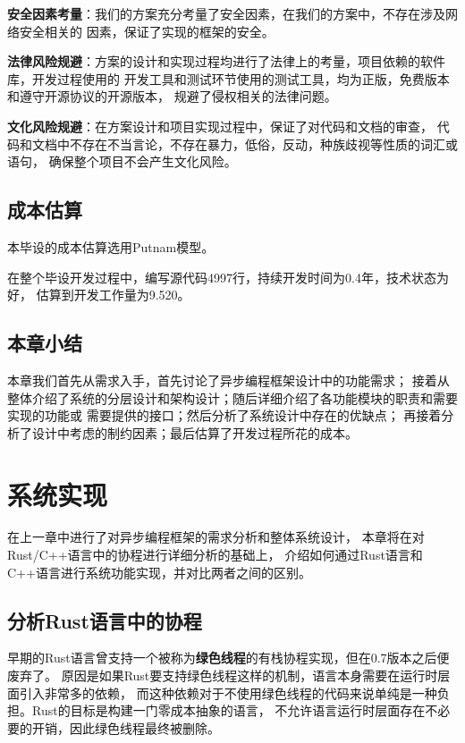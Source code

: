 \documentclass[supercite]{HustGraduPaper}
\theoremstyle{definition}
\begin{document}
\textbf{安全因素考量}：我们的方案充分考量了安全因素，在我们的方案中，不存在涉及网络安全相关的
因素，保证了实现的框架的安全。\par

\textbf{法律风险规避}：方案的设计和实现过程均进行了法律上的考量，项目依赖的软件库，开发过程使用的
开发工具和测试环节使用的测试工具，均为正版，免费版本和遵守开源协议的开源版本，
规避了侵权相关的法律问题。\par

\textbf{文化风险规避}：在方案设计和项目实现过程中，保证了对代码和文档的审查，
代码和文档中不存在不当言论，不存在暴力，低俗，反动，种族歧视等性质的词汇或语句，
确保整个项目不会产生文化风险。\par

\subsection{成本估算}

本毕设的成本估算选用Putnam模型。\par

在整个毕设开发过程中，编写源代码4997行，持续开发时间为0.4年，技术状态为好，
估算到开发工作量为9.520。\par

\subsection{本章小结}

本章我们首先从需求入手，首先讨论了异步编程框架设计中的功能需求；
接着从整体介绍了系统的分层设计和架构设计；随后详细介绍了各功能模块的职责和需要实现的功能或
需要提供的接口；然后分析了系统设计中存在的优缺点；
再接着分析了设计中考虑的制约因素；最后估算了开发过程所花的成本。\par

\section{系统实现}

在上一章中进行了对异步编程框架的需求分析和整体系统设计，
本章将在对Rust/C++语言中的协程进行详细分析的基础上，
介绍如何通过Rust语言和C++语言进行系统功能实现，并对比两者之间的区别。\par

\subsection{分析Rust语言中的协程}
早期的Rust语言曾支持一个被称为\textbf{绿色线程}的有栈协程实现，但在0.7版本之后便废弃了。
原因是如果Rust要支持绿色线程这样的机制，语言本身需要在运行时层面引入非常多的依赖，
而这种依赖对于不使用绿色线程的代码来说单纯是一种负担。Rust的目标是构建一门零成本抽象的语言，
不允许语言运行时层面存在不必要的开销，因此绿色线程最终被删除。\par
\end{document}
